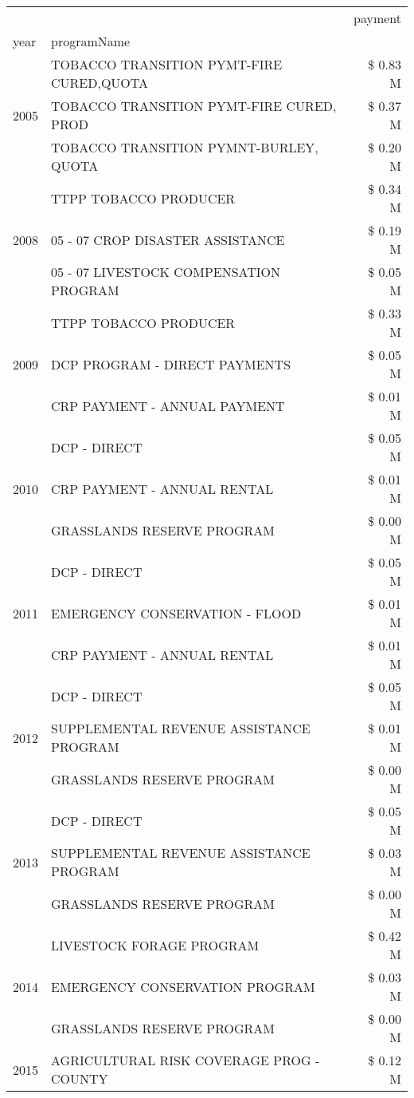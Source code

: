 \begin{tabular}{llr}
\toprule
 &  & payment \\
year & programName &  \\
\midrule
\multirow[t]{3}{*}{2005} & TOBACCO TRANSITION PYMT-FIRE CURED,QUOTA & \$ 0.83 M \\
 & TOBACCO TRANSITION PYMT-FIRE CURED, PROD & \$ 0.37 M \\
 & TOBACCO TRANSITION PYMNT-BURLEY, QUOTA & \$ 0.20 M \\
\cline{1-3}
\multirow[t]{3}{*}{2008} & TTPP TOBACCO PRODUCER & \$ 0.34 M \\
 & 05 - 07 CROP DISASTER ASSISTANCE & \$ 0.19 M \\
 & 05 - 07 LIVESTOCK COMPENSATION PROGRAM & \$ 0.05 M \\
\cline{1-3}
\multirow[t]{3}{*}{2009} & TTPP TOBACCO PRODUCER & \$ 0.33 M \\
 & DCP PROGRAM - DIRECT PAYMENTS & \$ 0.05 M \\
 & CRP PAYMENT - ANNUAL PAYMENT & \$ 0.01 M \\
\cline{1-3}
\multirow[t]{3}{*}{2010} & DCP - DIRECT & \$ 0.05 M \\
 & CRP PAYMENT - ANNUAL RENTAL & \$ 0.01 M \\
 & GRASSLANDS RESERVE PROGRAM & \$ 0.00 M \\
\cline{1-3}
\multirow[t]{3}{*}{2011} & DCP - DIRECT & \$ 0.05 M \\
 & EMERGENCY CONSERVATION - FLOOD & \$ 0.01 M \\
 & CRP PAYMENT - ANNUAL RENTAL & \$ 0.01 M \\
\cline{1-3}
\multirow[t]{3}{*}{2012} & DCP - DIRECT & \$ 0.05 M \\
 & SUPPLEMENTAL REVENUE ASSISTANCE PROGRAM & \$ 0.01 M \\
 & GRASSLANDS RESERVE PROGRAM & \$ 0.00 M \\
\cline{1-3}
\multirow[t]{3}{*}{2013} & DCP - DIRECT & \$ 0.05 M \\
 & SUPPLEMENTAL REVENUE ASSISTANCE PROGRAM & \$ 0.03 M \\
 & GRASSLANDS RESERVE PROGRAM & \$ 0.00 M \\
\cline{1-3}
\multirow[t]{3}{*}{2014} & LIVESTOCK FORAGE PROGRAM & \$ 0.42 M \\
 & EMERGENCY CONSERVATION PROGRAM & \$ 0.03 M \\
 & GRASSLANDS RESERVE PROGRAM & \$ 0.00 M \\
\cline{1-3}
\multirow[t]{3}{*}{2015} & AGRICULTURAL RISK COVERAGE PROG - COUNTY & \$ 0.12 M \\

\end{tabular}
